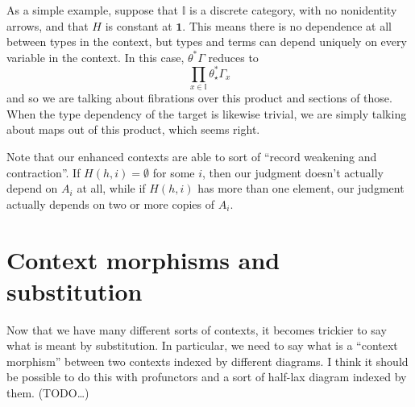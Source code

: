 \documentclass{amsart}
\def\I{\ensuremath{\mathbb{I}}}
\def\O{\ensuremath{\mathbb{O}}}
\theoremstyle{definition}
\begin{document}
As a simple example, suppose that $\I$ is a discrete category, with no nonidentity arrows, and that $H$ is constant at $\mathbf{1}$.
This means there is no dependence at all between types in the context, but types and terms can depend uniquely on every variable in the context.
In this case, $\theta^* \Gamma$ reduces to
\[ \prod_{x\in \I} \theta_{\star}^* \Gamma_x \]
and so we are talking about fibrations over this product and sections of those.
When the type dependency of the target is likewise trivial, we are simply talking about maps out of this product, which seems right.

Note that our enhanced contexts are able to sort of ``record weakening and contraction''.
If $H(h,i)=\emptyset$ for some $i$, then our judgment doesn't actually depend on $A_i$ at all, while if $H(h,i)$ has more than one element, our judgment actually depends on two or more copies of $A_i$.

\section{Context morphisms and substitution}
\label{sec:substitution}

Now that we have many different sorts of contexts, it becomes trickier to say what is meant by substitution.
In particular, we need to say what is a ``context morphism'' between two contexts indexed by different diagrams.
I think it should be possible to do this with profunctors and a sort of half-lax diagram indexed by them.
(TODO\dots)



\end{document}
